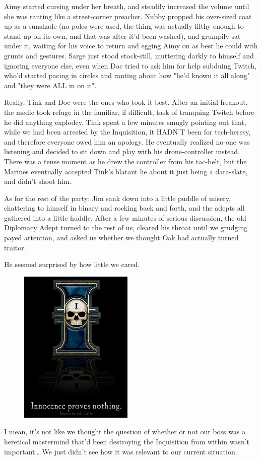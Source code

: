 Aimy started cursing under her breath, and steadily increased the volume until she was ranting like a street-corner preacher. 
Nubby propped his over-sized coat up as a sunshade (no poles were used, the thing was actually filthy enough to stand up on its own, and that was after it'd been washed), and grumpily sat under it, waiting for his voice to return and egging Aimy on as best he could with grunts and gestures. 
Sarge just stood stock-still, muttering darkly to himself and ignoring everyone else, even when Doc tried to ask him for help subduing Twitch, who'd started pacing in circles and ranting about how "he'd known it all along" and "they were ALL in on it".

Really, Tink and Doc were the ones who took it best. 
After an initial freakout, the medic took refuge in the familiar, if difficult, task of tranquing Twitch before he did anything explodey. 
Tink spent a few minutes smugly pointing out that, while we had been arrested by the Inquisition, it HADN'T been for tech-heresy, and therefore everyone owed him an apology. 
He eventually realized no-one was listening and decided to sit down and play with his drone-controller instead. 
There was a tense moment as he drew the controller from his tac-belt, but the Marines eventually accepted Tink's blatant lie about it just being a data-slate, and didn't shoot him.

As for the rest of the party: 
Jim sank down into a little puddle of misery, chattering to himself in binary and rocking back and forth, and the adepts all gathered into a little huddle. 
After a few minutes of serious discussion, the old Diplomacy Adept turned to the rest of us, cleared his throat until we grudging payed attention, and asked us whether we thought Oak had actually turned traitor. 


He seemed surprised by how little we cared.

\begin{figure}
	\begin{center}
		\includegraphics[width=\figwidth]{pics/16/6.png}
	\end{center}
\end{figure}
I mean, it's not like we thought the question of whether or not our boss was a heretical mastermind that'd been destroying the Inquisition from within wasn't important… We just didn't see how it was relevant to our current situation.

